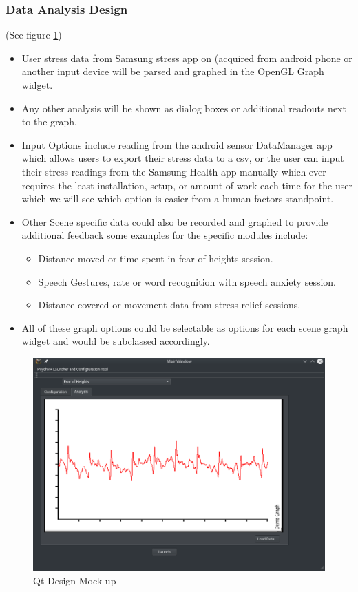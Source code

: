 \documentclass[a4paper,10pt]{article}
\begin{document}
\subsubsection{Data Analysis Design}
(See figure \ref{fig:qtMockupData})
  \begin{itemize}
  \item User stress data from Samsung stress app on (acquired from android phone or another input device will be parsed and graphed in the OpenGL Graph widget.
  \item Any other analysis will be shown as dialog boxes or additional readouts next to the graph.
  \item Input Options include reading from the android sensor DataManager app which allows users to export their stress data to a csv, or the user can input their stress readings
  from the Samsung Health app manually which ever requires the least installation, setup, or amount of work each time for the user which we will see which option is easier from a human 
  factors standpoint.
  \item Other Scene specific data could also be recorded and graphed to provide additional feedback some examples for the specific modules include:
	\begin{itemize}
	\item Distance moved or time spent in fear of heights session.
	\item Speech Gestures, rate or word recognition with speech anxiety session.
	\item Distance covered or movement data from stress relief sessions.
	\end{itemize}
\item All of these graph options could be selectable as options for each scene graph widget and would be subclassed accordingly.
  \end{itemize}
\begin{figure}[H]
				      \centerline{\includegraphics[scale = 0.35]{qtConfigData.png}}
					\caption{Qt Design Mock-up}
					\label{fig:qtMockupData}
				\end{figure}
\end{document}
